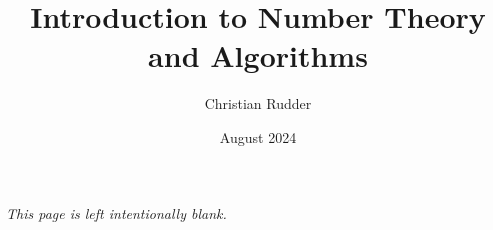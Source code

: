 \documentclass{memoir}
\title{Introduction to Number Theory and Algorithms}
\author{Christian Rudder}
\date{August 2024}
\begin{document}
\maketitle

\tableofcontents

\newpage
\thispagestyle{empty}
\mbox{}
\vfill
\begin{center}
    \textit{This page is left intentionally blank.}
\end{center}
\vfill
\newpage



\end{document}
